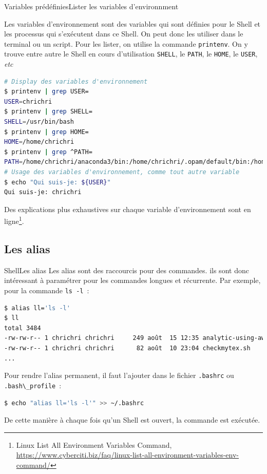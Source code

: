 \documentclass{beamer}
\begin{document}
    \begin{frame}[fragile]{Variables prédéfinies}{Lister les variables d'environnment}
        \begin{footnotesize}
            Les variables d'environnement sont des variables qui sont définies pour le Shell et les processus qui s'exécutent dans ce Shell.
            On peut donc les utiliser dans le terminal ou un script.
            \bigbreak
            Pour les lister, on utilise la commande \lstinline{printenv}.
            On y trouve entre autre le Shell en cours d'utilisation \lstinline{SHELL}, le \lstinline{PATH}, le \lstinline{HOME}, le \lstinline{USER}, \textit{etc}
            \begin{lstlisting}[language=bash,basicstyle=\tiny\ttfamily]
# Display des variables d'environnement
$ printenv | grep USER=
USER=chrichri
$ printenv | grep SHELL=
SHELL=/usr/bin/bash
$ printenv | grep HOME=
HOME=/home/chrichri
$ printenv | grep ^PATH=
PATH=/home/chrichri/anaconda3/bin:/home/chrichri/.opam/default/bin:/home/chrichri/.cargo/bin:/home/chrichri/.local/bin:/usr/local/sbin:/usr/local/bin:/usr/sbin:/usr/bin:/sbin:/bin:/usr/games:/usr/local/games:/snap/bin:/snap/bin:/home/chrichri/.dotnet/tools
# Usage des variables d'environnement, comme tout autre variable
$ echo "Qui suis-je: ${USER}"
Qui suis-je: chrichri
            \end{lstlisting}
            Des explications plus exhaustives sur chaque variable d'environnement sont en ligne\footnote{Linux List All Environment Variables Command, \url{https://www.cyberciti.biz/faq/linux-list-all-environment-variables-env-command/}}.
        \end{footnotesize}
    \end{frame}

    \subsection{Les alias}\label{subsec:alias}

    \begin{frame}[fragile]{Shell}{Les alias}
        Les alias sont des raccourcis pour des commandes.
        ils sont donc intéressant à paramétrer pour les commandes longues et récurrente.
        \bigbreak
        Par exemple, pour la commande \lstinline{ls -l}~:
        \begin{lstlisting}[language=bash]
$ alias ll='ls -l'
$ ll
total 3484
-rw-rw-r-- 1 chrichri chrichri     249 août  15 12:35 analytic-using-awk.sh
-rw-rw-r-- 1 chrichri chrichri      82 août  10 23:04 checkmytex.sh
...
        \end{lstlisting}
        \bigbreak
        Pour rendre l'alias permanent, il faut l'ajouter dans le fichier \lstinline{.bashrc} ou \lstinline{.bash\_profile}~:
        \begin{lstlisting}[language=bash]
$ echo "alias ll='ls -l'" >> ~/.bashrc
        \end{lstlisting}
        De cette manière à chaque fois qu'un Shell est ouvert, la commande est exécutée.
    \end{frame}
\end{document}
